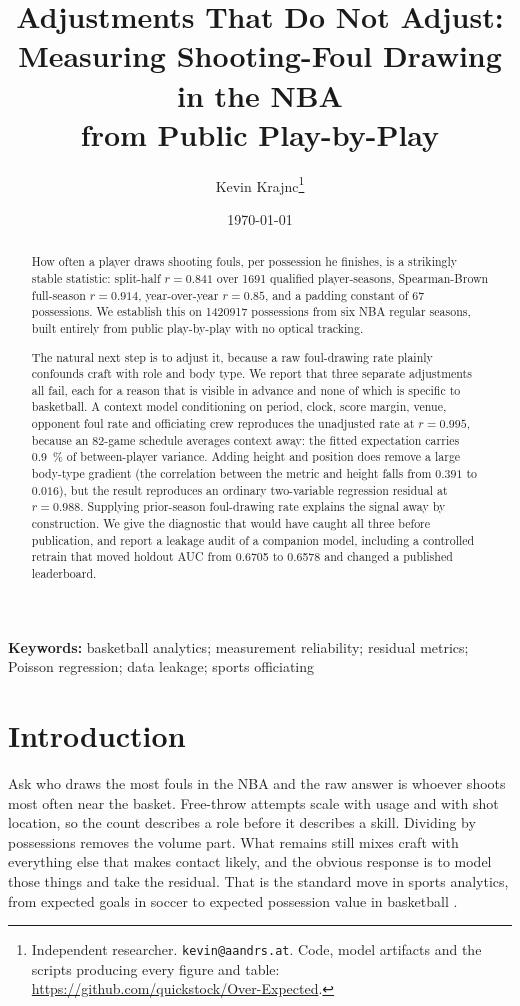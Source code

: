 \documentclass[11pt,a4paper]{article}
\title{\bfseries Adjustments That Do Not Adjust:\\
Measuring Shooting-Foul Drawing in the NBA\\
from Public Play-by-Play}
\author{Kevin Krajnc\thanks{Independent researcher.
\texttt{kevin@aandrs.at}. Code, model artifacts and the scripts producing every
figure and table: \url{https://github.com/quickstock/Over-Expected}.}}
\date{\today}
\begin{document}
\maketitle

\begin{abstract}
\noindent
How often a player draws shooting fouls, per possession he finishes, is a
strikingly stable statistic: split-half $r = 0.841$ over \num{1691} qualified
player-seasons, Spearman-Brown full-season $r = 0.914$, year-over-year
$r = 0.85$, and a padding constant of 67 possessions. We establish this on
\num{1420917} possessions from six NBA regular seasons, built entirely from
public play-by-play with no optical tracking.

The natural next step is to adjust it, because a raw foul-drawing rate plainly
confounds craft with role and body type. We report that three separate
adjustments all fail, each for a reason that is visible in advance and none of
which is specific to basketball. A context model conditioning on period, clock,
score margin, venue, opponent foul rate and officiating crew reproduces the
unadjusted rate at $r = 0.995$, because an 82-game schedule averages context
away: the fitted expectation carries \SI{0.9}{\percent} of between-player
variance. Adding height and position does remove a large body-type gradient
(the correlation between the metric and height falls from $0.391$ to $0.016$),
but the result reproduces an ordinary two-variable regression residual at
$r = 0.988$. Supplying prior-season foul-drawing rate explains the signal away
by construction. We give the diagnostic that would have caught all three before
publication, and report a leakage audit of a companion model, including a
controlled retrain that moved holdout AUC from 0.6705 to 0.6578 and changed a
published leaderboard.
\end{abstract}

\noindent\textbf{Keywords:} basketball analytics; measurement reliability;
residual metrics; Poisson regression; data leakage; sports officiating

\section{Introduction}

Ask who draws the most fouls in the NBA and the raw answer is whoever shoots
most often near the basket. Free-throw attempts scale with usage and with shot
location, so the count describes a role before it describes a skill. Dividing by
possessions removes the volume part. What remains still mixes craft with
everything else that makes contact likely, and the obvious response is to model
those things and take the residual. That is the standard move in sports
analytics, from expected goals in soccer \citep{rathke2017examination,
decroos2019actions} to expected possession value in basketball
\citep{cervone2016multiresolution}.
\end{document}
